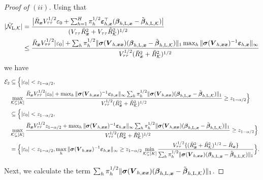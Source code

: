 \documentclass[12pt]{article}
\newcommand{\Lin}{\textnormal{L}}
\newcommand{\mk}{\mathcal{K}}
\newcommand{\bs}{\boldsymbol}
\newcommand{\vtt}{V_{\tau\tau}}
\begin{document}
\begin{proof}[Proof of  $(ii)$]
Using that 
\begin{align*}
    |\tilde{\mathcal{N}}_{\Lin, \mk}| &= \frac{\big|\bar{R}_{\bs{x}} V_{\tau\tau}^{1/2}\varepsilon_0+\sum_{h=1}^H \pi_{ h }^{1/2}\bs{\varepsilon}_{ h, \bs{x}}^\top (\bs{\beta}_{h, \Lin , \bs{x}}-\tilde{\bs{\beta}}_{ h, \Lin, \mk})\big|}{(V_{\tau\tau}\bar{R}_{\bs{x}}^2 +V_{\tau\tau}\tilde{R}^2_{\mk})^{1/2}}\\
    & \leq \frac{\bar{R}_{\bs{x}}\vtt^{1/2}|\varepsilon_0|+\sum_{h}\pi_{h}^{1/2}\|\bs{\sigma}(\bs{V}_{h,\bs{x}\bs{x}})(\bs{\beta}_{h, \Lin , \bs{x}}-\tilde{\bs{\beta}}_{h,\Lin,\mk})\|_1\max_{h}\|\bs{\sigma}(\bs{V}_{h,\bs{x}\bs{x}})^{-1}\bs{\varepsilon}_{h,\bs{x}}\|_\infty}{\vtt^{1/2}(\bar{R}_{\bs{x}}^2 + \tilde{R}^2_{\mk})^{1/2}}
\end{align*}
we have
\begin{align*}
    \mathcal{E}_2 &\subseteq  \Big\{|\varepsilon_0|< z_{1-\alpha/2},\\
    &\max_{\mk \subsetneq [K]}\frac{\bar{R}_{\bs{x}}\vtt^{1/2}|\varepsilon_0|+\max_{h}\|\bs{\sigma}(\bs{V}_{h,\bs{x}\bs{x}})^{-1}\bs{\varepsilon}_{h,\bs{x}}\|_\infty\sum_{h}\pi_{h}^{1/2}\|\bs{\sigma}(\bs{V}_{h,\bs{x}\bs{x}})(\bs{\beta}_{h, \Lin , \bs{x}}-\tilde{\bs{\beta}}_{h,\Lin,\mk})\|_1}{\vtt^{1/2}(\bar{R}_{\bs{x}}^2 + \tilde{R}^2_{\mk})^{1/2}} \geq z_{1-\alpha/2}\Big\}
\\
&\subseteq  \Big\{|\varepsilon_0|< z_{1-\alpha/2},\\
&\max_{\mk \subsetneq [K]}\frac{\bar{R}_{\bs{x}}\vtt^{1/2}z_{1-\alpha/2}+\max_{h}\|\bs{\sigma}(\bs{V}_{h,\bs{x}\bs{x}})^{-1}\bs{\varepsilon}_{h,\bs{x}}\|_\infty\sum_{h}\pi_{h}^{1/2}\|\bs{\sigma}(\bs{V}_{h,\bs{x}\bs{x}})(\bs{\beta}_{h, \Lin , \bs{x}}-\tilde{\bs{\beta}}_{h,\Lin,\mk})\|_1}{\vtt^{1/2}(\bar{R}_{\bs{x}}^2 + \tilde{R}^2_{\mk})^{1/2}} \geq z_{1-\alpha/2}\Big\}\\
    & =  \Big\{|\varepsilon_0|< z_{1-\alpha/2}, \max_{h}\|\bs{\sigma}(\bs{V}_{h,\bs{x}\bs{x}})^{-1}\bs{\varepsilon}_{h,\bs{x}}\|_\infty \geq z_{1-\alpha/2}\min_{\mk \subsetneq [K]}\frac{\vtt^{1/2}\{(\bar{R}_{\bs{x}}^2 + \tilde{R}^2_{\mk})^{1/2}-\bar{R}_{\bs{x}}\}}{\sum_{h}\pi_{h}^{1/2}\|\bs{\sigma}(\bs{V}_{h,\bs{x}\bs{x}})(\bs{\beta}_{h, \Lin , \bs{x}}-\tilde{\bs{\beta}}_{h,\Lin,\mk})\|_1}\Big\}.
\end{align*}

Next, we calculate the term $\sum_{h}\pi_{h}^{1/2}\|\bs{\sigma}(\bs{V}_{h,\bs{x}\bs{x}})(\bs{\beta}_{h, \Lin , \bs{x}}-\tilde{\bs{\beta}}_{h,\Lin,\mk})\|_1$.


\end{proof}
\end{document}
